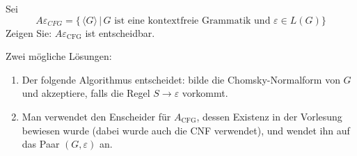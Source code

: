 Sei
\[
A\varepsilon_{CFG}=\{
\,\langle G\rangle\,|\,\text{$G$ ist eine kontextfreie Grammatik und $\varepsilon\in L(G)$}
\}
\]
Zeigen Sie: $A\varepsilon_{\text{CFG}}$ ist entscheidbar.


\begin{loesung}
Zwei mögliche Lösungen:
\begin{enumerate}
\item
Der folgende Algorithmus entscheidet: bilde die Chomsky-Normalform von $G$
und akzeptiere, falls die Regel $S\to\varepsilon$ vorkommt.
\item
Man verwendet den Enscheider für $A_{\text{CFG}}$, dessen
Existenz in der Vorlesung bewiesen wurde (dabei wurde auch die CNF
verwendet), und wendet ihn auf das Paar $(G,\varepsilon)$ an.
\qedhere
\end{enumerate}
\end{loesung}
